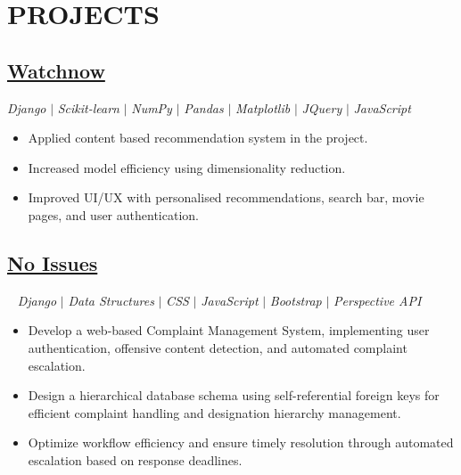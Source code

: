 \documentclass[12pt]{article}
\begin{document}
\section*{PROJECTS}
\subsection*{\href{https://github.com/prabhavagrawal7/watchnow/}{Watchnow}} \quad \small \textit{Django} $|$ \textit{Scikit-learn} $|$ \textit{NumPy} $|$ \textit{Pandas} $|$ \textit{Matplotlib} $|$ \textit{JQuery} $|$ \textit{JavaScript} \\
\begin{itemize}[topsep=0.7pt,itemsep=0.7pt,partopsep=0.7pt, parsep=0.7pt]
	\footnotesize
	\item Applied content based recommendation system in the project.
	\item Increased model efficiency using dimensionality reduction.
	\item Improved UI/UX with personalised recommendations, search bar, movie pages, and user authentication.
\end{itemize}
\vspace*{-6px}
\subsection*{\href{https://github.com/Akanksha2403/no_issues}{No Issues}}~ \quad \small \textit{Django} $\vert$ \textit{Data Structures} $\vert$ \textit{CSS} $\vert$ \textit{JavaScript} $\vert$ \textit{Bootstrap} $\vert$ \textit{Perspective API}\\ \small
\begin{itemize}[topsep=0.7pt,itemsep=0.7pt,partopsep=0.7pt, parsep=0.7pt]
	\footnotesize
	\item Develop a web-based Complaint Management System, implementing user authentication, offensive content detection, and automated complaint escalation.
	\item Design a hierarchical database schema using self-referential foreign keys for efficient complaint handling and designation hierarchy management.
	\item Optimize workflow efficiency and ensure timely resolution through automated escalation based on response deadlines.
\end{itemize}
\end{document}
